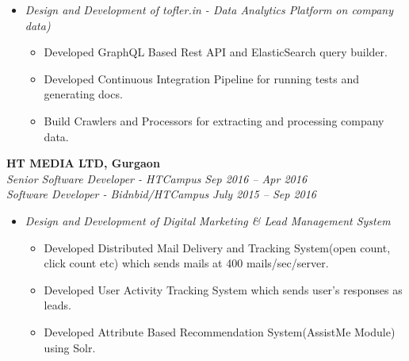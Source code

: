 \documentclass[margin,line]{resume}
\begin{document}
\begin{resume}
\begin{itemize}
     \item \textsl{Design and Development of tofler.in - Data Analytics Platform on company data) }
        \begin{itemize}
            \item Developed GraphQL Based Rest API and ElasticSearch query builder.
            \item Developed Continuous Integration Pipeline for running tests and generating docs.
            \item Build Crawlers and Processors for extracting and processing company data.
           
        \end{itemize}
    \end{itemize}
    
    \textbf{HT MEDIA LTD, Gurgaon}\\
           \textsl{Senior Software Developer - HTCampus} \hfill \textsl{Sep 2016 -- Apr 2016} \vspace{0mm}\\\vspace{0mm}%
           \textsl{Software Developer - Bidnbid/HTCampus} \hfill \textsl{July 2015 -- Sep 2016} \vspace{0mm}\\\vspace{0mm}%
    \begin{itemize}
    
     \item \textsl{Design and Development of Digital Marketing \& Lead Management System}
        \begin{itemize}
            \item Developed Distributed Mail Delivery and Tracking System(open count, click count etc) which
sends mails at 400 mails/sec/server.
            \item Developed User Activity Tracking System  which sends user's responses as leads.
		    \item Developed Attribute Based Recommendation System(AssistMe Module) using Solr.
        \end{itemize}




\end{itemize}
\end{resume}
\end{document}
